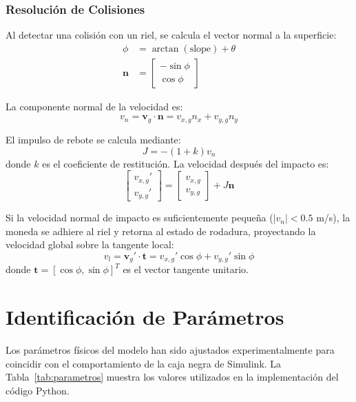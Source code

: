 \documentclass[
A4paper,            1 paper size A4
oneside,            %
openright,          %
10pt,               %
headings=normal,    %
titlepage=on        %
]{article}
\begin{document}
\subsubsection{Resolución de Colisiones}
Al detectar una colisión con un riel, se calcula el vector normal a la superficie:
\begin{align}
    \phi &= \arctan(\text{slope}) + \theta \\
    \mathbf{n} &= \begin{bmatrix} -\sin\phi \\ \cos\phi \end{bmatrix}
\end{align}

La componente normal de la velocidad es:
\begin{equation}
    v_n = \mathbf{v}_g \cdot \mathbf{n} = v_{x,g} n_x + v_{y,g} n_y
\end{equation}

El impulso de rebote se calcula mediante:
\begin{equation}
    J = -(1 + k) v_n
\end{equation}
donde $k$ es el coeficiente de restitución. La velocidad después del impacto es:
\begin{equation}
    \begin{bmatrix} v_{x,g}' \\ v_{y,g}' \end{bmatrix} = \begin{bmatrix} v_{x,g} \\ v_{y,g} \end{bmatrix} + J \mathbf{n}
\end{equation}

Si la velocidad normal de impacto es suficientemente pequeña ($|v_n| < 0.5$ m/s), la moneda se adhiere al riel y retorna al estado de rodadura, proyectando la velocidad global sobre la tangente local:
\begin{equation}
    v_l = \mathbf{v}_g' \cdot \mathbf{t} = v_{x,g}' \cos\phi + v_{y,g}' \sin\phi
\end{equation}
donde $\mathbf{t} = [\cos\phi, \sin\phi]^T$ es el vector tangente unitario.

\section{Identificación de Parámetros}
Los parámetros físicos del modelo han sido ajustados experimentalmente para coincidir con el comportamiento de la caja negra de Simulink. La Tabla~\ref{tab:parametros} muestra los valores utilizados en la implementación del código Python.
\end{document}
